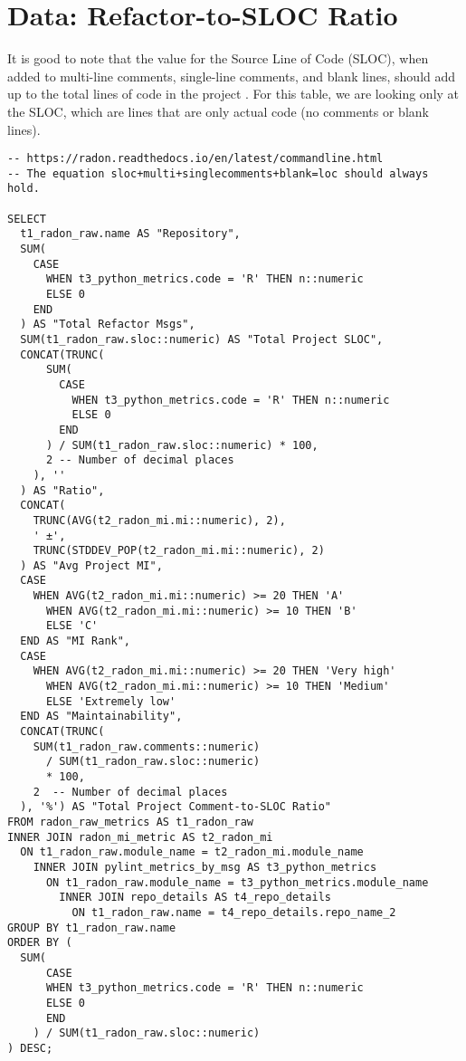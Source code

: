 \section{Data: Refactor-to-SLOC Ratio} \label{appendixRefactorRatio}

It is good to note that the value for the Source Line of Code (SLOC), when added to multi-line comments, single-line comments, and blank lines, should add up to the total lines of code in the project \cite{radon:docs}. For this table, we are looking only at the SLOC, which are lines that are only actual code (no comments or blank lines).

\begin{singlespace}
  \begin{verbatim}
-- https://radon.readthedocs.io/en/latest/commandline.html
-- The equation sloc+multi+singlecomments+blank=loc should always hold.

SELECT
  t1_radon_raw.name AS "Repository",
  SUM(
    CASE
      WHEN t3_python_metrics.code = 'R' THEN n::numeric
      ELSE 0
    END
  ) AS "Total Refactor Msgs",
  SUM(t1_radon_raw.sloc::numeric) AS "Total Project SLOC",
  CONCAT(TRUNC(
      SUM(
        CASE
          WHEN t3_python_metrics.code = 'R' THEN n::numeric
          ELSE 0
        END
      ) / SUM(t1_radon_raw.sloc::numeric) * 100,
      2 -- Number of decimal places
    ), ''
  ) AS "Ratio",
  CONCAT(
    TRUNC(AVG(t2_radon_mi.mi::numeric), 2), 
    ' ±', 
    TRUNC(STDDEV_POP(t2_radon_mi.mi::numeric), 2)
  ) AS "Avg Project MI",
  CASE
    WHEN AVG(t2_radon_mi.mi::numeric) >= 20 THEN 'A'
      WHEN AVG(t2_radon_mi.mi::numeric) >= 10 THEN 'B'
      ELSE 'C'
  END AS "MI Rank",
  CASE
    WHEN AVG(t2_radon_mi.mi::numeric) >= 20 THEN 'Very high'
      WHEN AVG(t2_radon_mi.mi::numeric) >= 10 THEN 'Medium'
      ELSE 'Extremely low'
  END AS "Maintainability",
  CONCAT(TRUNC(
    SUM(t1_radon_raw.comments::numeric) 
      / SUM(t1_radon_raw.sloc::numeric) 
      * 100, 
    2  -- Number of decimal places
  ), '%') AS "Total Project Comment-to-SLOC Ratio"
FROM radon_raw_metrics AS t1_radon_raw
INNER JOIN radon_mi_metric AS t2_radon_mi
  ON t1_radon_raw.module_name = t2_radon_mi.module_name
    INNER JOIN pylint_metrics_by_msg AS t3_python_metrics
      ON t1_radon_raw.module_name = t3_python_metrics.module_name
        INNER JOIN repo_details AS t4_repo_details
          ON t1_radon_raw.name = t4_repo_details.repo_name_2
GROUP BY t1_radon_raw.name
ORDER BY (
  SUM(
      CASE
      WHEN t3_python_metrics.code = 'R' THEN n::numeric
      ELSE 0
      END
    ) / SUM(t1_radon_raw.sloc::numeric)
) DESC; 
  \end{verbatim}
\end{singlespace}

